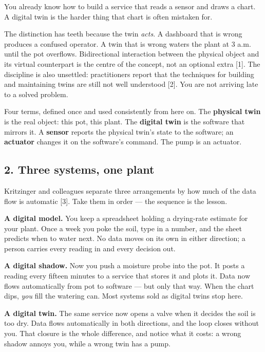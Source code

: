 \documentclass[
  12pt,
  a4paper,
]{article}
\begin{document}
You already know how to build a service that reads a sensor and draws a
chart. A digital twin is the harder thing that chart is often mistaken
for.

The distinction has teeth because the twin \emph{acts}. A dashboard that
is wrong produces a confused operator. A twin that is wrong waters the
plant at 3 a.m. until the pot overflows. Bidirectional interaction
between the physical object and its virtual counterpart is the centre of
the concept, not an optional extra {[}1{]}. The discipline is also
unsettled: practitioners report that the techniques for building and
maintaining twins are still not well understood {[}2{]}. You are not
arriving late to a solved problem.

Four terms, defined once and used consistently from here on. The
\textbf{physical twin} is the real object: this pot, this plant. The
\textbf{digital twin} is the software that mirrors it. A \textbf{sensor}
reports the physical twin's state to the software; an \textbf{actuator}
changes it on the software's command. The pump is an actuator.

\subsection{2. Three systems, one plant}\label{three-systems-one-plant}

Kritzinger and colleagues separate three arrangements by how much of the
data flow is automatic {[}3{]}. Take them in order --- the sequence is
the lesson.

\textbf{A digital model.} You keep a spreadsheet holding a drying-rate
estimate for your plant. Once a week you poke the soil, type in a
number, and the sheet predicts when to water next. No data moves on its
own in either direction; a person carries every reading in and every
decision out.

\textbf{A digital shadow.} Now you push a moisture probe into the pot.
It posts a reading every fifteen minutes to a service that stores it and
plots it. Data now flows automatically from pot to software --- but only
that way. When the chart dips, \emph{you} fill the watering can. Most
systems sold as digital twins stop here.

\textbf{A digital twin.} The same service now opens a valve when it
decides the soil is too dry. Data flows automatically in both
directions, and the loop closes without you. That closure is the whole
difference, and notice what it costs: a wrong shadow annoys you, while a
wrong twin has a pump.
\end{document}
